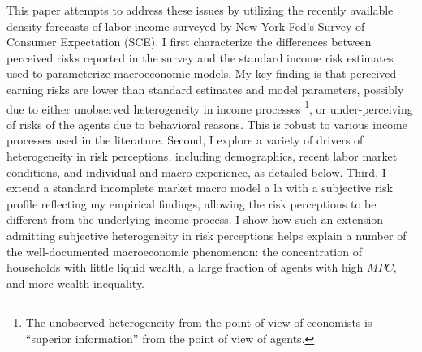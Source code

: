 
This paper attempts to address these issues by utilizing the recently available density forecasts of labor income surveyed by New York Fed's Survey of Consumer Expectation (SCE). I first characterize the differences between perceived risks reported in the survey and the standard income risk estimates used to parameterize macroeconomic models. My key finding is that perceived earning risks are lower than standard estimates and model parameters, possibly due to either unobserved heterogeneity in income processes \footnote{The unobserved heterogeneity from the point of view of economists is ``superior information'' from the point of view of agents.}, or under-perceiving of risks of the agents due to behavioral reasons. This is robust to various income processes used in the literature. Second, I explore a variety of drivers of heterogeneity in risk perceptions, including demographics, recent labor market conditions, and individual and macro experience, as detailed below. Third, I extend a standard incomplete market macro model a la \cite{huggett1993risk} with a subjective risk profile reflecting my empirical findings, allowing the risk perceptions to be different from the underlying income process. I show how such an extension admitting subjective heterogeneity in risk perceptions helps explain a number of the well-documented macroeconomic phenomenon: the concentration of households with little liquid wealth, a large fraction of agents with high $MPC$, and more wealth inequality. 


